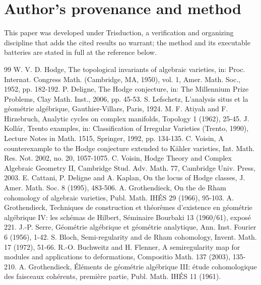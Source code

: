 \documentclass[10pt,twocolumn]{article}
\begin{document}
\hypertarget{authors-provenance-and-method}{%
\section*{Author's provenance and
method}\label{authors-provenance-and-method}}

This paper was developed under Trisduction, a verification and
organizing discipline that adds the cited results no warrant; the method
and its executable batteries are stated in full at the reference below.

\begin{thebibliography}{99}\small
{} W. V. D. Hodge, The topological invariants of algebraic varieties, in: Proc. Internat. Congress Math. (Cambridge, MA, 1950), vol. 1, Amer. Math. Soc., 1952, pp. 182-192.
 P. Deligne, The Hodge conjecture, in: The Millennium Prize Problems, Clay Math. Inst., 2006, pp. 45-53.
 S. Lefschetz, L'analysis situs et la géométrie algébrique, Gauthier-Villars, Paris, 1924.
 M. F. Atiyah and F. Hirzebruch, Analytic cycles on complex manifolds, Topology 1 (1962), 25-45.
 J. Kollár, Trento examples, in: Classification of Irregular Varieties (Trento, 1990), Lecture Notes in Math. 1515, Springer, 1992, pp. 134-135.
 C. Voisin, A counterexample to the Hodge conjecture extended to Kähler varieties, Int. Math. Res. Not. 2002, no. 20, 1057-1075.
 C. Voisin, Hodge Theory and Complex Algebraic Geometry II, Cambridge Stud. Adv. Math. 77, Cambridge Univ. Press, 2003.
 E. Cattani, P. Deligne and A. Kaplan, On the locus of Hodge classes, J. Amer. Math. Soc. 8 (1995), 483-506.
 A. Grothendieck, On the de Rham cohomology of algebraic varieties, Publ. Math. IHÉS 29 (1966), 95-103.
 A. Grothendieck, Techniques de construction et théorèmes d'existence en géométrie algébrique IV: les schémas de Hilbert, Séminaire Bourbaki 13 (1960/61), exposé 221.
 J.-P. Serre, Géométrie algébrique et géométrie analytique, Ann. Inst. Fourier 6 (1956), 1-42.
 S. Bloch, Semi-regularity and de Rham cohomology, Invent. Math. 17 (1972), 51-66.
 R.-O. Buchweitz and H. Flenner, A semiregularity map for modules and applications to deformations, Compositio Math. 137 (2003), 135-210.
 A. Grothendieck, Éléments de géométrie algébrique III: étude cohomologique des faisceaux cohérents, première partie, Publ. Math. IHÉS 11 (1961).

\end{thebibliography}
\end{document}
